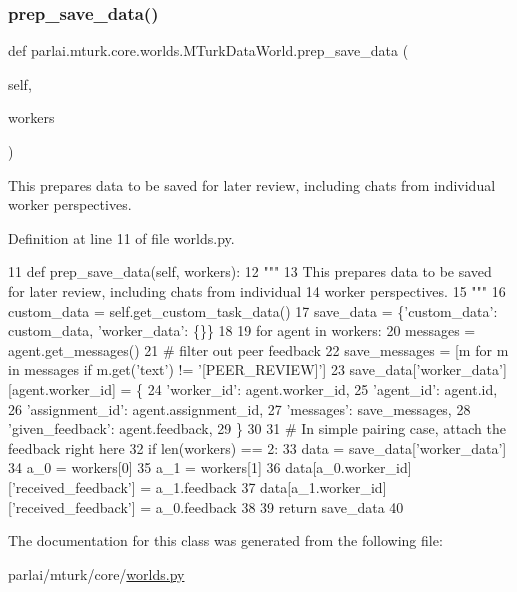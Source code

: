 \subsubsection{\texorpdfstring{prep\+\_\+save\+\_\+data()}{prep\_save\_data()}}
{\footnotesize\ttfamily def parlai.\+mturk.\+core.\+worlds.\+M\+Turk\+Data\+World.\+prep\+\_\+save\+\_\+data (\begin{DoxyParamCaption}\item[{}]{self,  }\item[{}]{workers }\end{DoxyParamCaption})}

\begin{DoxyVerb}This prepares data to be saved for later review, including chats from individual
worker perspectives.
\end{DoxyVerb}
 

Definition at line 11 of file worlds.\+py.


\begin{DoxyCode}
11     \textcolor{keyword}{def }prep\_save\_data(self, workers):
12         \textcolor{stringliteral}{"""}
13 \textcolor{stringliteral}{        This prepares data to be saved for later review, including chats from individual}
14 \textcolor{stringliteral}{        worker perspectives.}
15 \textcolor{stringliteral}{        """}
16         custom\_data = self.get\_custom\_task\_data()
17         save\_data = \{\textcolor{stringliteral}{'custom\_data'}: custom\_data, \textcolor{stringliteral}{'worker\_data'}: \{\}\}
18 
19         \textcolor{keywordflow}{for} agent \textcolor{keywordflow}{in} workers:
20             messages = agent.get\_messages()
21             \textcolor{comment}{# filter out peer feedback}
22             save\_messages = [m \textcolor{keywordflow}{for} m \textcolor{keywordflow}{in} messages \textcolor{keywordflow}{if} m.get(\textcolor{stringliteral}{'text'}) != \textcolor{stringliteral}{'[PEER\_REVIEW]'}]
23             save\_data[\textcolor{stringliteral}{'worker\_data'}][agent.worker\_id] = \{
24                 \textcolor{stringliteral}{'worker\_id'}: agent.worker\_id,
25                 \textcolor{stringliteral}{'agent\_id'}: agent.id,
26                 \textcolor{stringliteral}{'assignment\_id'}: agent.assignment\_id,
27                 \textcolor{stringliteral}{'messages'}: save\_messages,
28                 \textcolor{stringliteral}{'given\_feedback'}: agent.feedback,
29             \}
30 
31         \textcolor{comment}{# In simple pairing case, attach the feedback right here}
32         \textcolor{keywordflow}{if} len(workers) == 2:
33             data = save\_data[\textcolor{stringliteral}{'worker\_data'}]
34             a\_0 = workers[0]
35             a\_1 = workers[1]
36             data[a\_0.worker\_id][\textcolor{stringliteral}{'received\_feedback'}] = a\_1.feedback
37             data[a\_1.worker\_id][\textcolor{stringliteral}{'received\_feedback'}] = a\_0.feedback
38 
39         \textcolor{keywordflow}{return} save\_data
40 
\end{DoxyCode}


The documentation for this class was generated from the following file\+:\begin{DoxyCompactItemize}
\item 
parlai/mturk/core/\hyperlink{parlai_2mturk_2core_2worlds_8py}{worlds.\+py}\end{DoxyCompactItemize}
